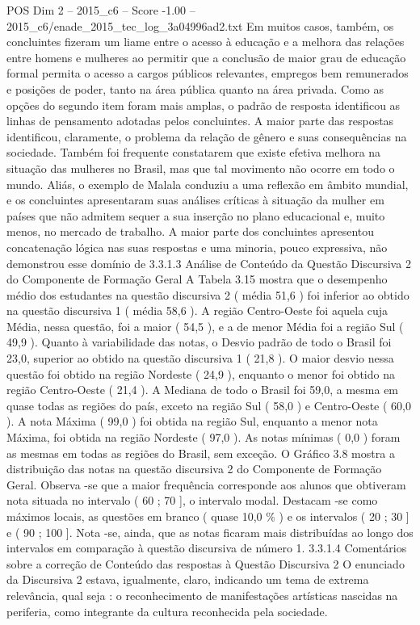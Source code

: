 \begin{textsample}{POS Dim 2 – 2015\_c6 – Score -1.00 – 2015\_c6/enade\_2015\_tec\_log\_3a04996ad2.txt}
Em muitos casos, também, os concluintes fizeram um liame entre o acesso à educação e a melhora das relações entre homens e mulheres ao permitir que a conclusão de maior grau de educação formal permita o acesso a cargos públicos relevantes, empregos bem remunerados e posições de poder, tanto na área pública quanto na área privada.
Como as opções do segundo item foram mais amplas, o padrão de resposta identificou as linhas de pensamento adotadas pelos concluintes.
A maior parte das respostas identificou, claramente, o problema da relação de gênero e suas consequências na sociedade.
Também foi frequente constatarem que existe efetiva melhora na situação das mulheres no Brasil, mas que tal movimento não ocorre em todo o mundo.
Aliás, o exemplo de Malala conduziu a uma reflexão em âmbito mundial, e os concluintes apresentaram suas análises críticas à situação da mulher em países que não admitem sequer a sua inserção no plano educacional e, muito menos, no mercado de trabalho.
A maior parte dos concluintes apresentou concatenação lógica nas suas respostas e uma minoria, pouco expressiva, não demonstrou esse domínio de 3.3.1.3 Análise de Conteúdo da Questão Discursiva 2 do Componente de Formação Geral A Tabela 3.15 mostra que o desempenho médio dos estudantes na questão discursiva 2 ( média 51,6 ) foi inferior ao obtido na questão discursiva 1 ( média 58,6 ).
A região Centro-Oeste foi aquela cuja Média, nessa questão, foi a maior ( 54,5 ), e a de menor Média foi a região Sul ( 49,9 ).
Quanto à variabilidade das notas, o Desvio padrão de todo o Brasil foi 23,0, superior ao obtido na questão discursiva 1 ( 21,8 ).
O maior desvio nessa questão foi obtido na região Nordeste ( 24,9 ), enquanto o menor foi obtido na região Centro-Oeste ( 21,4 ).
A Mediana de todo o Brasil foi 59,0, a mesma em quase todas as regiões do país, exceto na região Sul ( 58,0 ) e Centro-Oeste ( 60,0 ).
A nota Máxima ( 99,0 ) foi obtida na região Sul, enquanto a menor nota Máxima, foi obtida na região Nordeste ( 97,0 ).
As notas mínimas ( 0,0 ) foram as mesmas em todas as regiões do Brasil, sem exceção.
O Gráfico 3.8 mostra a distribuição das notas na questão discursiva 2 do Componente de Formação Geral.
Observa -se que a maior frequência corresponde aos alunos que obtiveram nota situada no intervalo ( 60 ; 70 ], o intervalo modal.
Destacam -se como máximos locais, as questões em branco ( quase 10,0 \% ) e os intervalos ( 20 ; 30 ] e ( 90 ; 100 ].
Nota -se, ainda, que as notas ficaram mais distribuídas ao longo dos intervalos em comparação à questão discursiva de número 1. 3.3.1.4 Comentários sobre a correção de Conteúdo das respostas à Questão Discursiva 2 O enunciado da Discursiva 2 estava, igualmente, claro, indicando um tema de extrema relevância, qual seja : o reconhecimento de manifestações artísticas nascidas na periferia, como integrante da cultura reconhecida pela sociedade.

\end{textsample}
